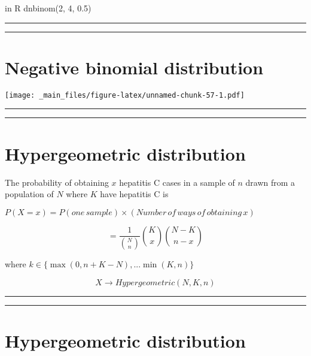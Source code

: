 \documentclass[
]{book}
\begin{document}
in R dnbinom(2, 4, 0.5)

\begin{center}\rule{0.5\linewidth}{0.5pt}\end{center}

\begin{center}\rule{0.5\linewidth}{0.5pt}\end{center}

\hypertarget{negative-binomial-distribution-3}{%
\section{Negative binomial distribution}\label{negative-binomial-distribution-3}}

\texttt{[image: \_main\_files/figure-latex/unnamed-chunk-57-1.pdf]}

\begin{center}\rule{0.5\linewidth}{0.5pt}\end{center}

\begin{center}\rule{0.5\linewidth}{0.5pt}\end{center}

\hypertarget{hypergeometric-distribution}{%
\section{Hypergeometric distribution}\label{hypergeometric-distribution}}

The probability of obtaining \(x\) hepatitis C cases in a sample of \(n\) drawn from a population of \(N\) where \(K\) have hepatitis C is

\(P(X=x)=P(one\,sample) \times (Number\, of\, ways\, of\, obtaining\, x)\)

\[=\frac{1}{\binom N n}\binom K x \binom {N-K} {n-x}\]

where \(k \in \{\max(0, n+K-N), ... \min(K, n) \}\)

\[X \rightarrow Hypergeometric(N,K,n)\]

\begin{center}\rule{0.5\linewidth}{0.5pt}\end{center}

\begin{center}\rule{0.5\linewidth}{0.5pt}\end{center}

\hypertarget{hypergeometric-distribution-1}{%
\section{Hypergeometric distribution}\label{hypergeometric-distribution-1}}
\end{document}
